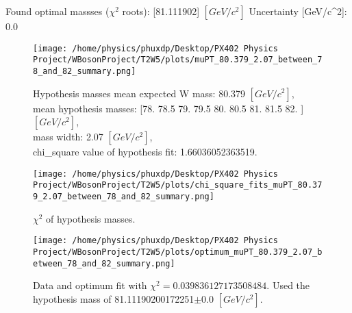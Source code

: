 \documentclass[12pt]{article}
\begin{document}
    Found optimal massses ($\chi^2$ roots): [81.111902] $[GeV/c^{2}]$
    Uncertainty [GeV/c^2]: 0.0

	\begin{figure}[tb]
		\centering
		\texttt{[image: /home/physics/phuxdp/Desktop/PX402 Physics Project/WBosonProject/T2W5/plots/muPT\_80.379\_2.07\_between\_78\_and\_82\_summary.png]}
		\caption{\small Hypothesis masses mean expected W mass: 80.379 $[GeV/c^{2}]$,\\
mean hypothesis masses: [78.  78.5 79.  79.5 80.  80.5 81.  81.5 82. ] $[GeV/c^{2}]$,\\
mass width: 2.07 $[GeV/c^{2}]$,\\
chi_square value of hypothesis fit: 1.66036052363519. }
		\label{fig: fig_0}
	\end{figure}

       \begin{figure}[tb]
		\centering
		\texttt{[image: /home/physics/phuxdp/Desktop/PX402 Physics Project/WBosonProject/T2W5/plots/chi\_square\_fits\_muPT\_80.379\_2.07\_between\_78\_and\_82\_summary.png]}
		\caption{\small $\chi^2$ of hypothesis masses. }
		\label{fig: fig_chi_square}
	\end{figure}

    \begin{figure}[tb]
		\centering
		\texttt{[image: /home/physics/phuxdp/Desktop/PX402 Physics Project/WBosonProject/T2W5/plots/optimum\_muPT\_80.379\_2.07\_between\_78\_and\_82\_summary.png]}
		\caption{\small Data and optimum fit with $\chi^2 = 0.039836127173508484$. Used the hypothesis mass of 81.11190200172251$\pm$0.0 $[GeV/c^{2}]$. }
		\label{fig: fig_optim_parms}
	\end{figure}
    
\end{document}
